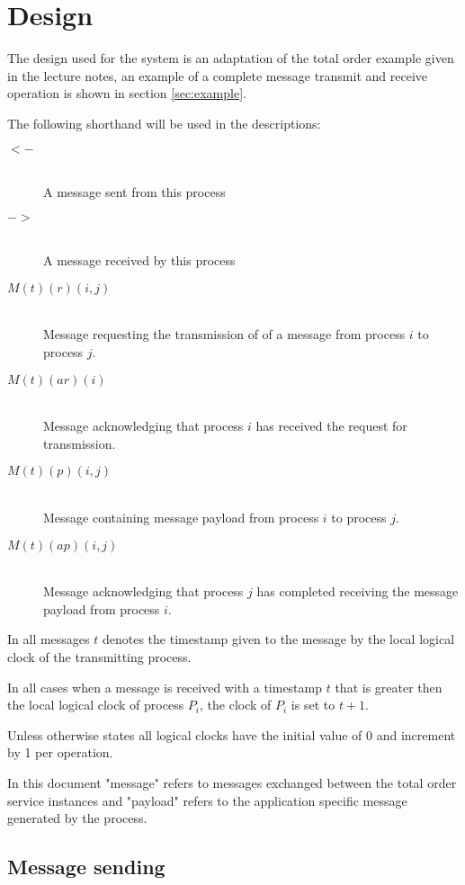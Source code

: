 \documentclass[twocolumn]{article}
\title{\DOCTITLE}
\author{\DOCAUTHOR}
\date{\DOCDATE}
\begin{document}
\section{Design}
\label{sec:design}

The design used for the system is an adaptation of the total order example given
in the lecture notes, an example of a complete message transmit and receive
operation is shown in section \ref{sec:example}.

The following shorthand will be used in the descriptions:

\begin{description}
  \item[$<-$] \hfill \\
    A message sent from this process
  \item[$->$] \hfill \\
    A message received by this process
  \item[$M(t)(r)(i,j)$] \hfill \\
    Message requesting the transmission of of a message from process $i$ to
    process $j$.
  \item[$M(t)(ar)(i)$] \hfill \\
    Message acknowledging that process $i$ has received the request for
    transmission.
  \item[$M(t)(p)(i,j)$] \hfill \\
    Message containing message payload from process $i$ to process $j$.
  \item[$M(t)(ap)(i,j)$] \hfill \\
    Message acknowledging that process $j$ has completed receiving the message
    payload from process $i$.
\end{description}

In all messages $t$ denotes the timestamp given to the message by the local
logical clock of the transmitting process.

In all cases when a message is received with a timestamp $t$ that is greater
then the local logical clock of process $P_{i}$, the clock of $P_{i}$ is set to
$t + 1$.

Unless otherwise states all logical clocks have the initial value of 0 and
increment by 1 per operation.

In this document "message" refers to messages exchanged between the total order
service instances and "payload" refers to the application specific message
generated by the process.

\subsection{Message sending}
\label{sec:sending}
\end{document}
